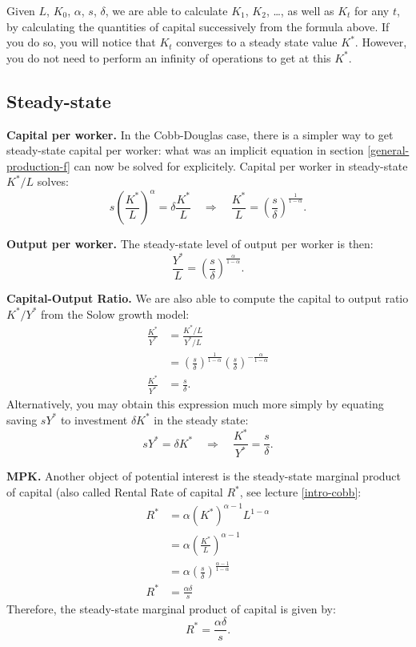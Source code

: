 \documentclass[]{book}
\begin{document}
Given \(L\), \(K_{0}\), \(\alpha\), \(s\), \(\delta\), we are able to
calculate \(K_{1}\), \(K_{2}\), \ldots{}, as well as \(K_{t}\) for any
\(t\), by calculating the quantities of capital successively from the
formula above. If you do so, you will notice that \(K_{t}\) converges to
a steady state value \(K^{*}\). However, you do not need to perform an
infinity of operations to get at this \(K^{*}\).

\subsection{Steady-state}\label{cobb-solow-steady-state}

\textbf{Capital per worker.} In the Cobb-Douglas case, there is a
simpler way to get steady-state capital per worker: what was an implicit
equation in section \ref{general-production-f} can now be solved for
explicitely. Capital per worker in steady-state \(K^{*}/L\) solves:
\[s\left(\frac{K^{*}}{L}\right)^{\alpha}=\delta\frac{K^{*}}{L}\quad\Rightarrow\quad \boxed{\frac{K^{*}}{L}=\left(\frac{s}{\delta}\right)^{\frac{1}{1-\alpha}}}.\]

\textbf{Output per worker.} The steady-state level of output per worker
is then:
\[\boxed{\frac{Y^{*}}{L}=\left(\frac{s}{\delta}\right)^{\frac{\alpha}{1-\alpha}}}.\]

\textbf{Capital-Output Ratio.} We are also able to compute the capital
to output ratio \(K^{*}/Y^{*}\) from the Solow growth model: \[
\begin{aligned}
\frac{K^{*}}{Y^{*}}&=\frac{K^{*}/L}{Y^{*}/L}\\
&=\left(\frac{s}{\delta}\right)^{\frac{1}{1-\alpha}}  \left(\frac{s}{\delta}\right)^{-\frac{\alpha}{1-\alpha}} \\
\frac{K^{*}}{Y^{*}}&= \frac{s}{\delta}.
\end{aligned}
\] Alternatively, you may obtain this expression much more simply by
equating saving \(sY^{*}\) to investment \(\delta K^{*}\) in the steady
state:
\[sY^{*} = \delta K^{*} \quad \Rightarrow \quad \boxed{\frac{K^{*}}{Y^{*}} = \frac{s}{\delta}}.\]

\textbf{MPK.} Another object of potential interest is the steady-state
marginal product of capital (also called Rental Rate of capital
\(R^{*}\), see lecture \ref{intro-cobb}: \[
\begin{aligned}
R^{*}&=\alpha \left(K^{*}\right)^{\alpha-1} L^{1-\alpha}\\
&=\alpha\left(\frac{K^{*}}{L}\right)^{\alpha-1}\\
&=\alpha\left(\frac{s}{\delta}\right)^{\frac{\alpha-1}{1-\alpha}}\\
R^{*}&=\frac{\alpha \delta}{s}
\end{aligned}
\] Therefore, the steady-state marginal product of capital is given by:
\[\boxed{R^{*}=\frac{\alpha \delta}{s}}.\]
\end{document}
